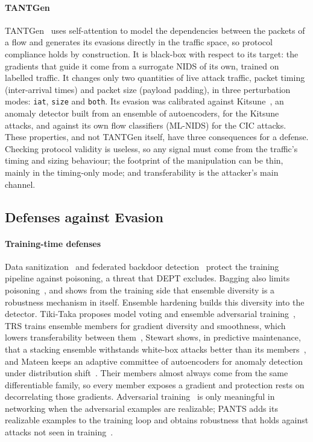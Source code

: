 \documentclass[acmtog,nonacm,pbalance]{acmart}
\newcommand{\dmode}[1]{\texttt{#1}}
\begin{document}
\paragraph{TANTGen} TANTGen~\cite{pissarra2026tantgen} uses self-attention to
model the dependencies between the packets of a flow and generates its
evasions directly in the traffic space, so protocol compliance holds by
construction. It is black-box with respect to its target: the gradients that
guide it come from a surrogate NIDS of its own, trained on labelled traffic.
It changes only two quantities of live attack traffic, packet timing
(inter-arrival times) and packet size (payload padding), in three perturbation
modes: \dmode{iat}, \dmode{size} and \dmode{both}. Its evasion was calibrated
against Kitsune~\cite{mirsky2018kitsune}, an anomaly detector built from an
ensemble of autoencoders, for the Kitsune attacks, and against its own
flow classifiers (ML-NIDS) for the CIC attacks. These properties, and not TANTGen itself, have three
consequences for a defense. Checking protocol validity is useless, so any
signal must come from the traffic's timing and sizing behaviour; the
footprint of the manipulation can be thin, mainly in the timing-only mode; and
transferability is the attacker's main channel.

\subsection{Defenses against Evasion}

\paragraph{Training-time defenses} Data
sanitization~\cite{rubinstein2009antidote} and federated backdoor
detection~\cite{rieger2024crowdguard} protect the training pipeline against
poisoning, a threat that DEPT excludes. Bagging also limits
poisoning~\cite{biggio2011bagging,chen2022collective}, and shows from the
training side that ensemble diversity is a robustness mechanism in itself.
Ensemble hardening builds this diversity into the detector. Tiki-Taka proposes
model voting and ensemble adversarial training~\cite{zhang2020tiki}, TRS trains
ensemble members for gradient diversity and smoothness, which lowers
transferability between them~\cite{yang2021trs}, Stewart shows, in predictive
maintenance, that a stacking ensemble withstands white-box attacks better than
its members~\cite{gungor2022stewart}, and Mateen keeps an adaptive committee of
autoencoders for anomaly detection under distribution
shift~\cite{alotaibi2024mateen}. Their members almost always come from the same
differentiable family, so every member exposes a gradient and protection rests
on decorrelating those gradients. Adversarial training~\cite{madry2018towards}
is only meaningful in networking when the adversarial examples are realizable;
PANTS adds its realizable examples to the training loop and obtains
robustness that holds against attacks not seen in
training~\cite{jin2025robustifying}.
\end{document}

